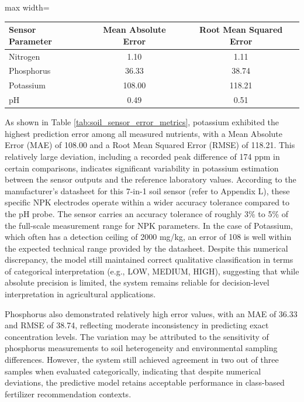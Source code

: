 {\begin{table}[H]
		\begin{adjustbox}{max width=\textwidth}
			\begin{tabular}{lcc}
				\toprule
				\textbf{Sensor Parameter} & \textbf{Mean Absolute Error} & \textbf{Root Mean Squared Error} \\
				\midrule
				Nitrogen    & 1.10   & 1.11   \\
				Phosphorus  & 36.33  & 38.74  \\
				Potassium   & 108.00 & 118.21 \\
				pH          & 0.49   & 0.51   \\
				\bottomrule
			\end{tabular}
		\end{adjustbox}
		
	\end{table}
	
	As shown in Table \ref{tab:soil_sensor_error_metrics}, potassium exhibited the highest prediction error among all measured nutrients, with a Mean Absolute Error (MAE) of 108.00 and a Root Mean Squared Error (RMSE) of 118.21. This relatively large deviation, including a recorded peak difference of 174 ppm in certain comparisons, indicates significant variability in potassium estimation between the sensor outputs and the reference laboratory values. According to the manufacturer's datasheet for this 7-in-1 soil sensor (refer to Appendix L), these specific NPK electrodes operate within a wider accuracy tolerance compared to the pH probe. The sensor carries an accuracy tolerance of roughly 3\% to 5\% of the full-scale measurement range for NPK parameters. In the case of Potassium, which often has a detection ceiling of 2000 mg/kg, an error of 108 is well within the expected technical range provided by the datasheet. Despite this numerical discrepancy, the model still maintained correct qualitative classification in terms of categorical interpretation (e.g., LOW, MEDIUM, HIGH), suggesting that while absolute precision is limited, the system remains reliable for decision-level interpretation in agricultural applications.
	
	Phosphorus also demonstrated relatively high error values, with an MAE of 36.33 and RMSE of 38.74, reflecting moderate inconsistency in predicting exact concentration levels. The variation may be attributed to the sensitivity of phosphorus measurements to soil heterogeneity and environmental sampling differences. However, the system still achieved agreement in two out of three samples when evaluated categorically, indicating that despite numerical deviations, the predictive model retains acceptable performance in class-based fertilizer recommendation contexts.
	
}
